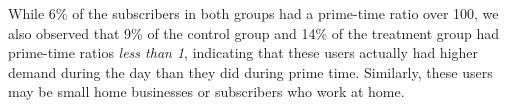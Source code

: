 While 6\% of the subscribers in both groups had a prime-time ratio over
100, we also observed that 9\% of the control group and 14\% of the
treatment group had prime-time ratios {\em less than 1}, indicating that
these users actually had higher demand during the day than they did
during prime time. Similarly, these users may be small home
businesses or subscribers who work at home.



